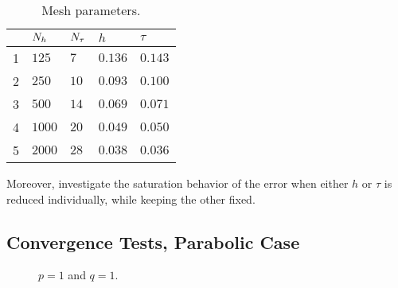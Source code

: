 \begin{table}[!ht]
    \centering
    \def\arraystretch{1.25}
    \begin{tabular}{ | C{1cm} || C{2cm} | C{2cm} | C{2cm} | C{2cm} | }
        \hline
         & $N_h$ & $N_{\tau}$ & $h$ & $\tau$ \\
        \hline
         & $125$ & $7$ & $\num{0.136}$ & $\num{0.143}$ \\
        2 & $250$ & $10$ & $\num{0.093}$ & $\num{0.100}$ \\
        3 & $500$ & $14$ & $\num{0.069}$ & $\num{0.071}$ \\
        4 & $1000$ & $20$ & $\num{0.049}$ & $\num{0.050}$ \\
        5 & $2000$ & $28$ & $\num{0.038}$ & $\num{0.036}$ \\
        \hline
    \end{tabular}
    \caption{Mesh parameters.}
    \label{table:ht}
\end{table}

Moreover,  investigate the saturation behavior of the error when either $h$ or $\tau$ is reduced individually, while keeping the other fixed.

\newpage
\subsection{Convergence Tests, Parabolic Case} \label{sec:graphs_1}


\vspace*{\fill}
\begin{figure}[!ht]
    \begin{subfigure}[t]{0.49\textwidth}
        \centering
        
        \label{graph:1_1_par_l2l2}
    \end{subfigure}
    \hfill
    \begin{subfigure}[t]{0.49\textwidth}
        \centering
        
        \label{graph:1_1_par_l2h1}
    \end{subfigure}
    \par\bigskip
    \begin{subfigure}[t]{0.49\textwidth}
        \centering
        
        \label{graph:1_1_par_l2T}
    \end{subfigure}
    \hfill
    \begin{subfigure}[t]{0.49\textwidth}
        \centering
        
        \label{graph:1_1_par_linfl2}
    \end{subfigure}
    \caption{$p = 1$ and $q = 1$.}
\end{figure}
\vspace*{\fill}

